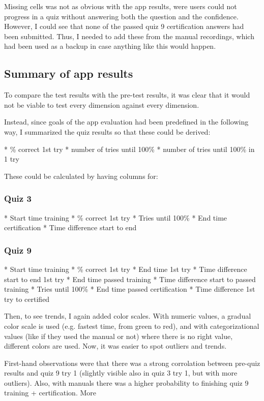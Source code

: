 Missing cells was not as obvious with the app results, were users could not progress in a quiz without answering both the question and the confidence. However, I could see that none of the passed quiz 9 certification answers had been submitted. Thus, I needed to add these from the manual recordings, which had been used as a backup in case anything like this would happen.

\subsection{Summary of app results}

To compare the test results with the pre-test results, it was clear that it would not be viable to test every dimension against every dimension.

Instead, since goals of the app evaluation had been predefined in the following way, I summarized the quiz results so that these could be derived:

* \% correct 1st try
* number of tries until 100\%
* number of tries until 100\% in 1 try

These could be calculated by having columns for:

\subsubsection{Quiz 3}
* Start time training
* \% correct 1st try
* Tries until 100\%
* End time certification
* Time difference start to end

\subsubsection{Quiz 9}
* Start time training
* \% correct 1st try
* End time 1st try
* Time difference start to end 1st try
* End time passed training
* Time difference start to passed training
* Tries until 100\%
* End time passed certification
* Time difference 1st try to certified

Then, to see trends, I again added color scales. With numeric values, a gradual color scale is used (e.g. fastest time, from green to red), and with categorizational values (like if they used the manual or not) where there is no right value, different colors are used. Now, it was easier to spot outliers and trends.

First-hand observations were that there was a strong corrolation between pre-quiz results and quiz 9 try 1 (slightly visible also in quiz 3 try 1, but with more outliers). Also, with manuals there was a higher probability to finishing quiz 9 training + certification. More 

